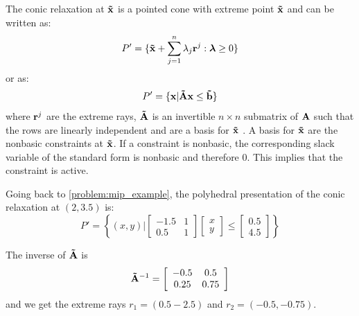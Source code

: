 The conic relaxation at $\bold{\tilde x}$ is a pointed cone with extreme point $\bold{\tilde x}$ and can be written as: 
\begin{equation} \label{Eq:conic_relaxation}
    P' = \{ \bold{\tilde x} + \sum_{j=1}^n \lambda_j \bold r^j : \boldsymbol \lambda \geq 0 \}
\end{equation}
or as:
\begin{equation} \label{Eq:conic_relaxation_polyhedral}
    P' = \{\bold x|\bold{\tilde Ax} \leq \bold{\tilde b}\}
\end{equation} 
where $\bold r^j$ are the extreme rays, $\bold{\tilde A}$ is an invertible $n\times n$ submatrix of $ \bold A$ such that the rows are linearly independent and are a basis for $\bold{\tilde x}$ \cite{bienstock_outer_product_free_sets}. 
A basis for $\bold{\tilde x}$ are the nonbasic constraints at $\bold{\tilde x}$.
If a constraint is nonbasic, the corresponding slack variable of the standard form is nonbasic and therefore 0. This implies that the constraint is active. 

Going back to \cref{problem:mip_example}, the polyhedral presentation of the conic relaxation at $(2, 3.5)$ is:
\begin{equation*}
    P' =     
    \left\{ (x,y) \Bigg|
        \left[ \begin{array}{cc}
            -1.5 & 1 \\
            0.5 & 1
        \end{array}\right]
        \left[ \begin{array}{c}
            x \\ y
        \end{array} \right] \leq
        \left[ \begin{array}{c}
            0.5 \\ 4.5
        \end{array} \right] 
    \right\}
\end{equation*}

The inverse of $\bold{\tilde A}$ is 
\begin{equation*}
    \bold{\tilde A}^{-1} =     
        \left[ \begin{array}{cc}
            -0.5 & 0.5 \\
            0.25 & 0.75
        \end{array}\right]
\end{equation*}
and we get the extreme rays $r_1 = (0.5 -2.5)$ and $r_2= (-0.5, -0.75)$.


